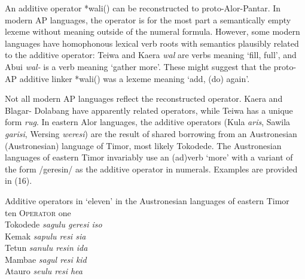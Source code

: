 {An additive operator *wali({\ng}) can be reconstructed to proto-Alor-Pantar. In modern AP languages, the operator is for the most part a semantically empty lexeme without meaning outside of the numeral formula. However, some modern languages have homophonous lexical verb roots with semantics plausibly related to the additive operator: Teiwa and Kaera \textit{wal} are verbs meaning `fill, full', and Abui \textit{wal-} is a verb meaning `gather more'. These might suggest that the proto-AP additive linker *wali({\ng}) was a lexeme meaning `add, (do) again'.

Not all modern AP languages reflect the reconstructed operator. Kaera and Blagar- Dolabang have apparently related operators, while Teiwa has a unique form \textit{rug}. In eastern Alor languages, the additive operators (Kula \textit{aris}\textit{{\textbari}}\textit{{\ng}}, Sawila \textit{garisi{\ng}}, Wersing \textit{weresi{\ng}}) are the result of shared borrowing from an Austronesian (Austronesian) language of Timor, most likely Tokodede. The Austronesian languages of eastern Timor invariably use an (ad)verb `more' with a variant of the form /geresin/ as the additive operator in numerals. Examples are provided in (16).



\ea%
\label{ex:16}
Additive operators in `eleven' in the Austronesian languages of eastern Timor\\
\gllllll {}  ten    O\textsc{perator}    one  \\
  Tokodede    \textit{sagulu  geresi    iso}           \\
  Kemak     \textit{sapulu  resi    sia}           \\
Tetun    \textit{sanulu  resin    ida}           \\
Mambae    \textit{sagul    resi    kid}           \\
Atauro    \textit{se{\ng}ulu  resi    hea}           \\

\glt
\z









}
